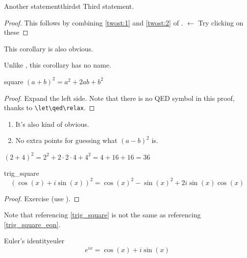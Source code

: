 \begin{corollary}{Another statement}{thirdst}
Third statement.
\end{corollary}
\begin{proof}
This follows by combining \ref{twost:1} and \ref{twost:2} of . $\gets$ \scriptsize{\textsf{Try clicking on these}}
\end{proof}
\begin{remark}
This corollary is also obvious.
\end{remark}

\begin{corollary}{}{}
Unlike , this corollary has no name.
\end{corollary}

\begin{lemma}{}{square}
$(a+b)^2=a^2+2ab+b^2$
\end{lemma}
\begin{proof}\let\qed\relax
Expand the left side. Note that there is no QED symbol in this proof, thanks to \verb!\let\qed\relax!.
\end{proof}
\begin{remarks}\leavevmode %
\begin{enumerate}
    \item It's also kind of obvious.
    \item No extra points for guessing what $(a-b)^2$ is.
\end{enumerate}
\end{remarks}

\begin{example}
$(2+4)^2=2^2+2\cdot 2\cdot 4+4^2=4+16+16=36$
\end{example}

\begin{proposition}{}{trig_square}
\begin{equation}\label{trig_square_eqn} (\cos(x)+i\sin(x))^2=\cos(x)^2-\sin(x)^2+2i\sin(x)\cos(x)
\end{equation}
\end{proposition}
\begin{proof}
Exercise (use ).
\end{proof}

Note that referencing \cref{trig_square} is not the same as referencing \eqref{trig_square_eqn}.

\begin{lemma}{Euler's identity}{euler}
\begin{equation*}
    e^{ix}=\cos(x)+i\sin(x)
\end{equation*}
\end{lemma}

